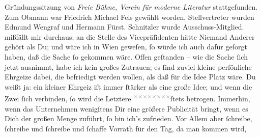 \begin{ledgroupsized}[t]{13cm}
{{{                  Gründungssitzung von \emph{Freie Bühne, Verein für
                     moderne Literatur} stattgefunden. Zum Obmann war Friedrich
                     Michael Fels gewählt worden, Stellvertreter wurden Edmund Wengraf und Hermann Fürst. Schnitzler wurde Ausschuss-Mitglied.}}}\label{K_L02668-13h} mißfällt mir durchaus; an die Stelle des
               Vicepräſidenten hätte Niemand Anderer gehört als Du; und wäre ich in Wien geweſen, ſo würde ich auch dafür geſorgt haben, daß die
               Sache {\pb}ſo gekommen wäre. Offen geſtanden – wie die
               Sache ſich jetzt ausnimmt, habe ich kein großes Zutrauen; es ſind zuviel kleine
               perſönliche Ehrgeize dabei, die befriedigt werden wollen, als daß für die Idee Platz
               wäre. Du weißt ja: ein kleiner Ehrgeiz iſt immer ſtärker als eine große Idee; und
               wenn die Zwei ſich verbinden, ſo wird die Letztere \substVorne{}\textsuperscript{\textcolor{gray}{×}\-\textcolor{gray}{×}\-\textcolor{gray}{×}\-\textcolor{gray}{×}\-\textcolor{gray}{×}\-\textcolor{gray}{×}\-\textcolor{gray}{×}\-\textcolor{gray}{×}}\substDazwischen{}ſtets\substHinten{} betrogen. Immerhin, wenn das Unternehmen wenigſtens Dir eine größere Publicität bringt,
               wenn es Dich der großen Menge zuführt, ſo bin ich’s zufrieden. Vor Allem aber
               ſchreibe, ſchreibe und ſchreibe und ſchaffe Vorrath für den Tag, da man kommen wird,

\end{ledgroupsized}
